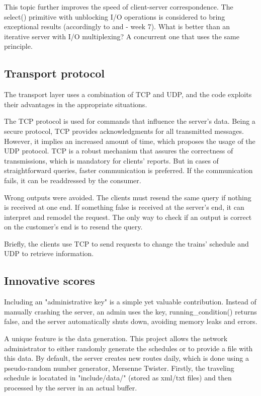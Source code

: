 \documentclass[runningheads]{llncs}
\begin{document}
This topic further improves the speed of client-server correspondence. The select() primitive with unblocking I/O operations is considered to bring exceptional results (accordingly to \cite{non-block-select} and \cite{course} - week 7). What is better than an iterative server with I/O multiplexing? A concurrent one that uses the same principle.

\subsection{Transport protocol}

The transport layer uses a combination of TCP and UDP, and the code exploits their advantages in the appropriate situations.

The TCP protocol is used for commands that influence the server's data. Being a secure protocol, TCP provides acknowledgments for all transmitted messages. However, it implies an increased amount of time, which proposes the usage of the UDP protocol. TCP is a robust mechanism that assures the correctness of transmissions, which is mandatory for clients' reports. But in cases of straightforward queries, faster communication is preferred. If the communication fails, it can be readdressed by the consumer.

Wrong outputs were avoided. The clients must resend the same query if nothing is received at one end. If something false is received at the server's end, it can interpret and remodel the request. The only way to check if an output is correct on the customer's end is to resend the query.

Briefly, the clients use TCP to send requests to change the trains' schedule and UDP to retrieve information.

\subsection{Innovative scores}

Including an "administrative key" is a simple yet valuable contribution. Instead of manually crashing the server, an admin uses the key, running\_condition() returns false, and the server automatically shuts down, avoiding memory leaks and errors.

A unique feature is the data generation. This project allows the network administrator to either randomly generate the schedules or to provide a file with this data. By default, the server creates new routes daily, which is done using a pseudo-random number generator, Mersenne Twister. Firstly, the traveling schedule is locatated in "include/data/" (stored as xml/txt files) and then processed by the server in an actual buffer.
\end{document}

